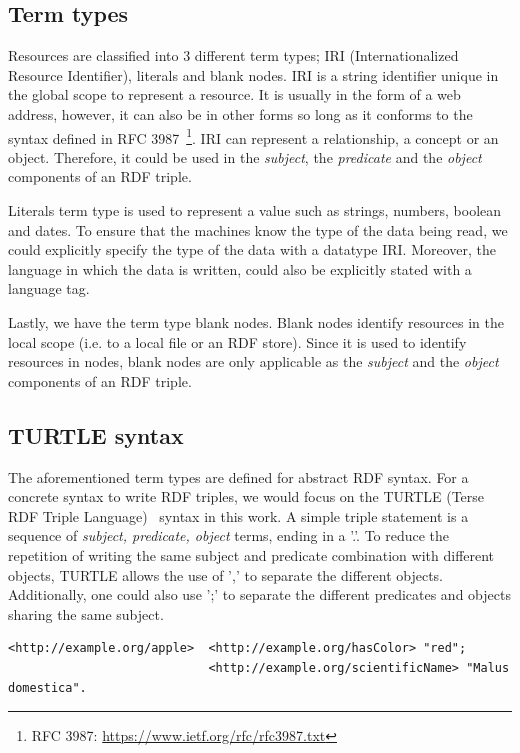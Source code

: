 \subsection{Term types}
Resources are classified into 3 different term types; IRI (Internationalized Resource Identifier),
literals and blank nodes. IRI is a string identifier unique in the global scope to
represent a resource. It is usually in the form of a web address, however, it can
also be in other forms so long as it conforms to the syntax defined in
RFC 3987~\footnote{RFC 3987: \url{https://www.ietf.org/rfc/rfc3987.txt}}.
IRI can represent a relationship, a concept or an object. Therefore, it could be
used in the \textit{subject}, the \textit{predicate} and the \textit{object} components of
an RDF triple.

Literals term type is used to represent a value such as strings, numbers, boolean and dates.
To ensure that the machines know the type of the data being read, we could
explicitly specify the type of the data with a datatype IRI. Moreover, the
language in which the data is written, could also be explicitly stated with
a language tag.

Lastly, we have the term type blank nodes. Blank nodes identify resources
in the local scope (i.e. to a local file or an RDF store). Since it is used to
identify resources in nodes, blank nodes are only applicable as the \textit{subject}
and the \textit{object} components of an RDF triple.


\subsection{TURTLE syntax}
The aforementioned term types are defined for abstract RDF syntax. For a concrete syntax to write
RDF triples, we would focus on the TURTLE (Terse RDF Triple Language)~\cite{turtle_syntax}
syntax in this work. A simple triple statement is a sequence of
\textit{subject, predicate, object} terms, ending in a '.'.
To reduce the repetition of writing the same subject and predicate combination with
different objects, TURTLE allows the use of ',' to separate the different objects.
Additionally, one could also use ';' to separate the different predicates and objects sharing the
same subject. 


\begin{lstlisting}[label={lst:same_subject}, 
    caption={Usage of ';' where triples share the same subject.}]
<http://example.org/apple>  <http://example.org/hasColor> "red";
                            <http://example.org/scientificName> "Malus domestica".
\end{lstlisting}

